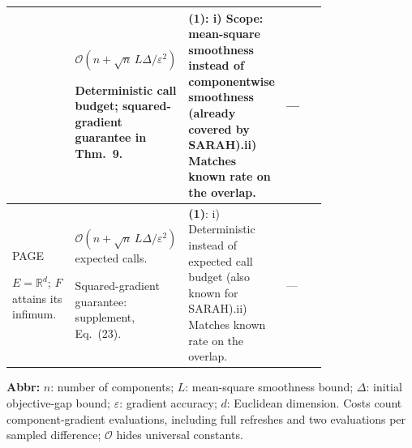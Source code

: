 \begin{table}[tp]
\begin{threeparttable}
\begin{tabularx}{\linewidth}{@{}>{\raggedright\arraybackslash}p{0.20\linewidth}>{\raggedright\arraybackslash}p{0.32\linewidth}>{\raggedright\arraybackslash}p{0.25\linewidth}>{\raggedright\arraybackslash}X@{}}
& $\mathcal{O}\!(n+\sqrt n\,L\Delta/\varepsilon^2)$\par Deterministic call budget; squared-gradient guarantee in Thm.~9.
& \textbf{(1)}: i) Scope: mean-square smoothness instead of componentwise smoothness (already covered by SARAH).\newline ii) Matches known rate on the overlap.
& --- \\
\midrule
PAGE \citep[Thm.~1, Cor.~2]{li2021pagefsnc}\par $E=\mathbb{R}^d$; $F$ attains its infimum.
& $\mathcal{O}\!(n+\sqrt n\,L\Delta/\varepsilon^2)$ expected calls.\par Squared-gradient guarantee: supplement, Eq.~(23).
& \textbf{(1)}: i) Deterministic instead of expected call budget (also known for SARAH).\newline ii) Matches known rate on the overlap.
& --- \\
\bottomrule
\end{tabularx}
\begin{tablenotes}[flushleft]\footnotesize
\item[] \textbf{Abbr:} $n$: number of components; $L$: mean-square smoothness bound; $\Delta$: initial objective-gap bound; $\varepsilon$: gradient accuracy; $d$: Euclidean dimension. Costs count component-gradient evaluations, including full refreshes and two evaluations per sampled difference; $\mathcal{O}$ hides universal constants.
\end{tablenotes}
\end{threeparttable}
\end{table}
\clearpage

